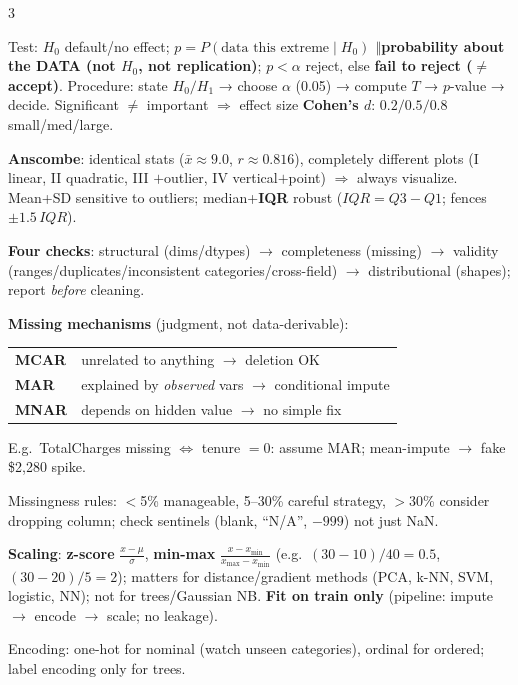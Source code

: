 \documentclass[a4paper,fontsize=8pt]{scrartcl}
\newenvironment{ul}{\begin{list}{\textbullet}{\setlength{\leftmargin}{1.05em}\setlength{\labelwidth}{0.6em}\setlength{\labelsep}{0.35em}\setlength{\itemsep}{0.45pt}\setlength{\parsep}{0pt}\setlength{\topsep}{0.65pt}\setlength{\partopsep}{0pt}}}{\end{list}}
\newcommand{\secG}[1]{\vspace{2.4pt}{\colorbox{hdrG}{\color{white}\bfseries\sffamily\scriptsize\ #1\ }}\par\vspace{1.4pt}}
\newcommand{\sep}{\ensuremath{\boldsymbol{\Vert}}}
\newcommand{\fn}[1]{\colorbox{hlp}{\textbf{#1}}}
\begin{document}
\begin{multicols*}{3}
\begin{ul}
\item Test: $H_0$ default/no effect; \textbf{$p=P(\text{data this extreme}\mid H_0)$ \sep probability about the DATA (not $H_0$, not replication)}; $p<\alpha$ reject, else \textbf{fail to reject ($\ne$ accept)}. Procedure: state $H_0/H_1$ → choose $\alpha$ (0.05) → compute $T$ → $p$-value → decide. Significant $\ne$ important $\Rightarrow$ effect size \fn{Cohen's $d$}: $0.2/0.5/0.8$ small/med/large.
\item \fn{Anscombe}: identical stats ($\bar x\approx9.0$, $r\approx0.816$), completely different plots (I linear, II quadratic, III $+$outlier, IV vertical$+$point) $\Rightarrow$ always visualize. Mean+SD sensitive to outliers; median+\fn{IQR} robust ($IQR=Q3-Q1$; fences $\pm1.5\,IQR$).
\end{ul}

\secG{L4/L1 · WRANGLING QUICK}
\begin{ul}
\item \textbf{Four checks}: structural (dims/dtypes) $\to$ completeness (missing) $\to$ validity (ranges/duplicates/inconsistent categories/cross-field) $\to$ distributional (shapes); report \emph{before} cleaning.
\item \textbf{Missing mechanisms} (judgment, not data-derivable):\\
{\footnotesize
\begin{tabular}{@{}l p{4.35cm}@{}}
\textbf{MCAR} & unrelated to anything $\to$ deletion OK\\
\textbf{MAR} & explained by \emph{observed} vars $\to$ conditional impute\\
\textbf{MNAR} & depends on hidden value $\to$ no simple fix\\
\end{tabular}}\par
E.g.\ TotalCharges missing $\Leftrightarrow$ tenure $=0$: assume MAR; mean-impute $\to$ fake \$2{,}280 spike.
\item Missingness rules: $<$5\% manageable, 5--30\% careful strategy, $>$30\% consider dropping column; check sentinels (blank, ``N/A'', $-999$) not just NaN.
\item \textbf{Scaling}: \fn{z-score} $\frac{x-\mu}{\sigma}$, \fn{min-max} $\frac{x-x_{\min}}{x_{\max}-x_{\min}}$ (e.g.\ $(30{-}10)/40=0.5$, $(30{-}20)/5=2$); matters for distance/gradient methods (PCA, k-NN, SVM, logistic, NN); not for trees/Gaussian NB. \textbf{Fit on train only} (pipeline: impute $\to$ encode $\to$ scale; no leakage).
\item Encoding: one-hot for nominal (watch unseen categories), ordinal for ordered; label encoding only for trees.

\end{ul}
\end{multicols*}
\end{document}

